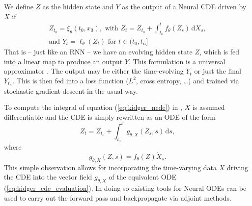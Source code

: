 \documentclass{article}
\newcommand{\dby}{\mathrm{d}}
\begin{document}
We define $Z$ as the hidden state and $Y$ as the output of a Neural CDE driven by $X$ if
\begin{multline}
    Z_{t_0} = \xi_\theta(t_0, x_0), \text{ with } Z_t = Z_{t_0} + \int^{t}_{t_0} f_\theta(Z_s)\,\dby X_s, \\
    \text{and } Y_t = \ell_\theta(Z_t) \text{ for } t \in (t_0, t_n]
    \label{eq:kidger_ncde}
\end{multline}
That is -- just like an RNN -- we have an evolving hidden state $Z$, which is fed into a linear map to produce an output $Y$. This formulation is a universal approximator \citep[Appendix B]{kidger2020neural}. The output may be either the time-evolving $Y_t$ or just the final $Y_{t_n}$. This is then fed into a loss function ($L^2$, cross entropy, \ldots) and trained via stochastic gradient descent in the usual way.

To compute the integral of equation (\ref{eq:kidger_ncde}) in \citet{kidger2020neural}, $X$ is assumed differentiable and the CDE is simply rewritten as an ODE of the form
\begin{equation}
     Z_t = Z_{t_0} + \int^{t}_{t_0} g_{\theta, X}(Z_s, s)\,\dby s,
     \label{eq:kidger_cde_evaluation}
\end{equation}
where 
\begin{equation}
    g_{\theta, X}(Z, s) = f_\theta(Z) \dot X_s. 
    \label{eq:kidger_g_X}
\end{equation}
This simple observation allows for incorporating the time-varying data $X$ driving the CDE into the vector field $g_{\theta,X}$ of the equivalent ODE (\ref{eq:kidger_cde_evaluation}). In doing so existing tools for Neural ODEs can be used to carry out the forward pass and backpropagate via adjoint methods.











\global\def\xs{{0.        , 0.13157895, 0.26315789, 0.39473684, 0.52631579,
       0.65789474, 0.78947368, 0.92105263, 1.05263158, 1.18421053,
       1.31578947, 1.44736842, 1.57894737, 1.71052632, 1.84210526,
       1.97368421, 2.10526316, 2.23684211, 2.36842105, 2.5}}
\global\def\ys{{0.        , 0.48565753, 0.84647908, 1.09613282, 1.24828692,
       1.31660956, 1.31476892, 1.25643315, 1.15527045, 1.02494897,
       0.8791369 , 0.73150241, 0.59571366, 0.48543884, 0.41434611,
       0.39610366, 0.44437965, 0.57284225, 0.79515964, 1.125}}
       
\end{document}
